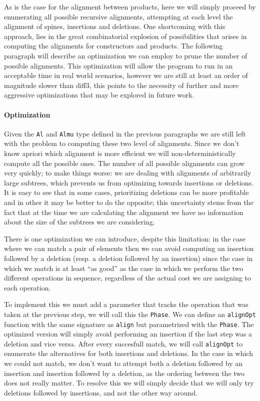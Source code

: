 \documentclass[11pt]{article}
\begin{document}
As is the case for the alignment between products, here we will simply proceed 
by enumerating all possible recursive alignments, attempting at each level 
the alignment of spines, insertions and deletions.
One shortcoming with this approach, lies in the great combinatorial 
explosion of possibilities that arises in computing the alignments for 
constructors and products. The following paragraph will describe an optimization 
we can employ to prune the number of possible alignments. This optimization 
will allow the program to run in an acceptable time in real world scenarios, however 
we are still at least an order of magnitude slower than diff3, this points to 
the necessity of further and more aggressive optimizations that may be explored 
in future work.

\paragraph{Optimization}\label{optimizations}

Given the \texttt{Al} and \texttt{Almu} type defined in the previous paragraphs we are still left with the problem
to computing these two level of alignments. Since we don't know apriori which alignment
is more efficient we will non-deterministically compute all the possible ones. The number of all possible alignments  
can grow very quickly; to make things worse: we are dealing with alignments of arbitrarily large subtrees, which prevents
us from optimizing towards insertions or deletions. It is easy to see
that in some cases, prioritizing deletions can be more profitable and in
other it may be better to do the opposite; this uncertainty stems from
the fact that at the time we are calculating the alignment we have no
information about the size of the subtrees we are considering.

There is one optimization we can introduce, despite this limitation: in
the case where we can match a pair of elements then we can avoid
computing an insertion followed by a deletion (resp. a deletion followed
by an insertion) since the case in which we match is at least ``as
good'' as the case in which we perform the two different operations in
sequence, regardless of the actual cost we are assigning to each
operation.

To implement this we must add a parameter that tracks the operation that
was taken at the previous step, we will call this the \texttt{Phase}. We
can define an \texttt{alignOpt} function with the same signature as
\texttt{align} but parametrized with the \texttt{Phase}. The optimized
version will simply avoid performing an insertion if the last step was a
deletion and vice versa. 
After every succesfull match, we will call \texttt{alignOpt} to enumerate the alternatives for both insertions and
deletions. In the case in which we could not match, we don't 
want to attempt both a deletion followed by an insertion and insertion followed by a deletion, as the 
ordering between the two does not really matter. To resolve this we will simply 
decide that we will only try deletions followed by insertions, and not the other 
way around.
\end{document}
